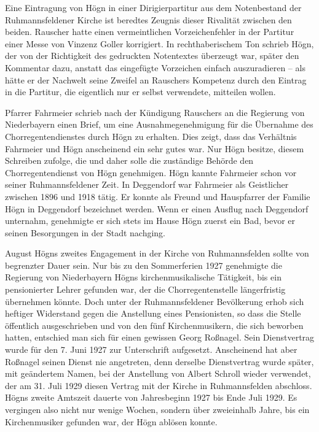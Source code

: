 Eine Eintragung von Högn in einer Dirigierpartitur aus dem Notenbestand
der Ruhmannsfeldener Kirche ist beredtes Zeugnis dieser Rivalität
zwischen den beiden. Rauscher hatte einen vermeintlichen
Vorzeichenfehler in der Partitur einer Messe von Vinzenz Goller
korrigiert. In rechthaberischem Ton schrieb Högn, der von der
Richtigkeit des gedruckten Notentextes überzeugt war, später den
Kommentar 
dazu, anstatt das eingefügte Vorzeichen einfach auszuradieren – als
hätte er der Nachwelt seine Zweifel an Rauschers Kompetenz durch den
Eintrag in die Partitur, die eigentlich nur er selbst verwendete,
mitteilen wollen.

Pfarrer Fahrmeier schrieb nach der Kündigung Rauschers an die Regierung
von Niederbayern einen Brief, um eine Ausnahmegenehmigung für die
Übernahme des Chorregentendienstes durch Högn zu erhalten. Dies
zeigt, dass das Verhältnis Fahrmeier und Högn anscheinend ein sehr
gutes war. Nur Högn besitze, diesem Schreiben zufolge, die
 und daher solle die
zuständige Behörde den Chorregentendienst von Högn
 genehmigen. Högn kannte Fahrmeier
schon vor seiner Ruhmannsfeldener Zeit. In Deggendorf war Fahrmeier als
Geistlicher zwischen 1896 und 1918 tätig. Er konnte als Freund und
Hauspfarrer der Familie Högn in Deggendorf bezeichnet werden. Wenn er
einen Ausflug nach Deggendorf unternahm, genehmigte er sich stets im
Hause Högn zuerst ein Bad, bevor er seinen Besorgungen in der Stadt
nachging.

August Högns zweites Engagement in der Kirche von Ruhmannsfelden sollte
von begrenzter Dauer sein. Nur bis zu den Sommerferien 1927
genehmigte die Regierung von Niederbayern Högns kirchenmusikalische
Tätigkeit, bis ein pensionierter Lehrer gefunden war, der die
Chorregentenstelle längerfristig übernehmen könnte. Doch unter der
Ruhmannsfeldener Bevölkerung erhob sich heftiger Widerstand gegen die
Anstellung eines Pensionisten, so dass die Stelle öffentlich
ausgeschrieben und von den fünf Kirchenmusikern, die sich beworben
hatten, entschied man sich für einen gewissen Georg Roßnagel. Sein
Dienstvertrag wurde für den 7. Juni 1927 zur Unterschrift aufgesetzt.
Anscheinend hat aber Roßnagel seinen Dienst nie angetreten, denn
derselbe Dienstvertrag wurde später, mit geändertem Namen, bei der
Anstellung von Albert Schroll wieder verwendet, der am 31. Juli 1929
diesen Vertrag mit der Kirche in Ruhmannsfelden abschloss. Högns zweite
Amtszeit dauerte von Jahresbeginn 1927 bis Ende Juli 1929. Es vergingen
also nicht nur wenige Wochen, sondern über zweieinhalb Jahre, bis ein
Kirchenmusiker gefunden war, der Högn ablösen konnte.

